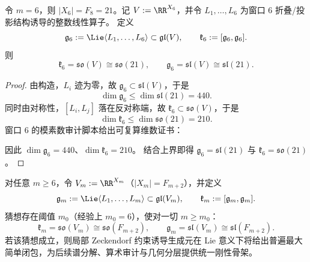 \begin{theorem}[窗口 \texorpdfstring{\(m=6\)}{m=6} 的 Lie 闭合达到最大正交与特殊线性]\label{thm:xi-time-part9e-window6-lie-maximal-closure}
令 \(m=6\)，则 \(|X_6|=F_8=21\)。记 \(V:=\RR^{X_6}\)，并令 \(L_1,\dots,L_6\) 为窗口 \(6\) 折叠/投影结构诱导的整数线性算子。
定义
\[
\mathfrak g_6:=\Lie\langle L_1,\dots,L_6\rangle\subset\mathfrak{gl}(V),
\qquad
\mathfrak k_6:=[\mathfrak g_6,\mathfrak g_6].
\]
则
\[
\mathfrak k_6=\mathfrak{so}(V)\cong\mathfrak{so}(21),
\qquad
\mathfrak g_6=\mathfrak{sl}(V)\cong\mathfrak{sl}(21).
\]
\end{theorem}
\begin{proof}
由构造，\(L_i\) 迹为零，故 \(\mathfrak g_6\subset\mathfrak{sl}(V)\)，于是
\[
\dim\mathfrak g_6\le \dim\mathfrak{sl}(21)=440.
\]
同时由对称性，\([L_i,L_j]\) 落在反对称端，故 \(\mathfrak k_6\subset\mathfrak{so}(V)\)，于是
\[
\dim\mathfrak k_6\le \dim\mathfrak{so}(21)=210.
\]
窗口 \(6\) 的模素数审计脚本给出可复算维数证书：


因此 \(\dim\mathfrak g_6=440\)、\(\dim\mathfrak k_6=210\)。
结合上界即得
\(
\mathfrak g_6=\mathfrak{sl}(21)
\)
与
\(
\mathfrak k_6=\mathfrak{so}(21)
\)。
\end{proof}

\begin{conjecture}[窗口族的普遍最大正交闭合]\label{conj:xi-time-part9e-window-general-maximal-closure}
对任意 \(m\ge 6\)，令 \(V_m:=\RR^{X_m}\)（\(|X_m|=F_{m+2}\)），并定义
\[
\mathfrak g_m:=\Lie\langle L_1,\dots,L_m\rangle\subset\mathfrak{gl}(V_m),
\qquad
\mathfrak k_m:=[\mathfrak g_m,\mathfrak g_m].
\]
猜想存在阈值 \(m_0\)（经验上 \(m_0=6\)），使对一切 \(m\ge m_0\)：
\[
\mathfrak k_m=\mathfrak{so}(V_m)\cong\mathfrak{so}(F_{m+2}),
\qquad
\mathfrak g_m=\mathfrak{sl}(V_m)\cong\mathfrak{sl}(F_{m+2}).
\]
若该猜想成立，则局部 Zeckendorf 约束诱导生成元在 Lie 意义下将给出普遍最大简单闭包，为后续谱分解、算术审计与几何分层提供统一刚性骨架。
\end{conjecture}

